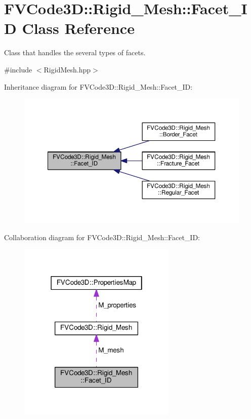 \hypertarget{classFVCode3D_1_1Rigid__Mesh_1_1Facet__ID}{}\section{F\+V\+Code3D\+:\+:Rigid\+\_\+\+Mesh\+:\+:Facet\+\_\+\+ID Class Reference}
\label{classFVCode3D_1_1Rigid__Mesh_1_1Facet__ID}


Class that handles the several types of facets.  




{\ttfamily \#include $<$Rigid\+Mesh.\+hpp$>$}



Inheritance diagram for F\+V\+Code3D\+:\+:Rigid\+\_\+\+Mesh\+:\+:Facet\+\_\+\+ID\+:
\nopagebreak
\begin{figure}[H]
\begin{center}
\leavevmode
\includegraphics[width=350pt]{classFVCode3D_1_1Rigid__Mesh_1_1Facet__ID__inherit__graph}
\end{center}
\end{figure}


Collaboration diagram for F\+V\+Code3D\+:\+:Rigid\+\_\+\+Mesh\+:\+:Facet\+\_\+\+ID\+:
\nopagebreak
\begin{figure}[H]
\begin{center}
\leavevmode
\includegraphics[width=214pt]{classFVCode3D_1_1Rigid__Mesh_1_1Facet__ID__coll__graph}
\end{center}
\end{figure}
